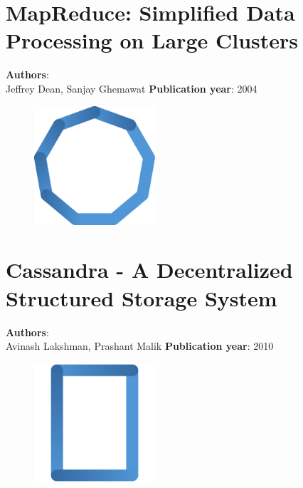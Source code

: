 \documentclass[11pt,fleqn]{book} %
\begin{document}
\chapter{MapReduce: Simplified Data Processing on Large Clusters}
\vspace*{-7mm}
\Large \textbf{Authors}: \\
Jeffrey Dean, Sanjay Ghemawat
\newline\newline
\textbf{Publication year}: 2004
\begin{figure}[b]
    \centering
    \includegraphics[width=0.4\textwidth]{distributed-systems-blue.pdf}
\end{figure}


\chapter{Cassandra - A Decentralized Structured Storage System}
\vspace*{-7mm}
\Large \textbf{Authors}: \\
Avinash Lakshman, Prashant Malik
\newline\newline
\textbf{Publication year}: 2010
\begin{figure}[b]
    \centering
    \includegraphics[width=0.4\textwidth]{distributed-systems-rectangle-blue.pdf}
\end{figure}

\end{document}
